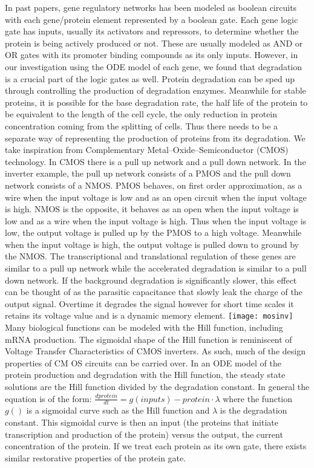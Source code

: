 \documentclass{article}
\begin{document}
In past papers, gene regulatory networks has been modeled as boolean circuits with each gene/protein element represented by a boolean gate.  Each gene logic gate has inputs, usually its activators and repressors, to determine whether the protein is being actively produced or not.  These are usually modeled as AND or OR gates with its promoter binding compounds as its only inputs.  However, in our investigation using the ODE model of each gene, we found that degradation is a crucial part of the logic gates as well.  Protein degradation can be sped up through controlling the production of degradation enzymes.  Meanwhile for stable proteins, it is possible for the base degradation rate, the half life of the protein to be equivalent to the length of the cell cycle, the only reduction in protein concentration coming from the splitting of cells.  Thus there needs to be a separate way of representing the production of proteins from its degradation.  We take inspiration from Complementary Metal–Oxide–Semiconductor (CMOS) technology.  In CMOS there is a pull up network and a pull down network.  In the inverter example, the pull up network consists of a PMOS and the pull down network consists of a NMOS.  PMOS behaves, on first order approximation, as a wire when the input voltage is low and as an open circuit when the input voltage is high.  NMOS is the opposite, it behaves as an open when the input voltage is low and as a wire when the input voltage is high.  Thus when the input voltage is low, the output voltage is pulled up by the PMOS to a high voltage.  Meanwhile when the input voltage is high, the output voltage is pulled down to ground by the NMOS.  The transcriptional and translational regulation of these genes are similar to a pull up network while the accelerated degradation is similar to a pull down network.  If the background degradation is significantly slower, this effect can be thought of as the parasitic capacitance that slowly leak the charge of the output signal.  Overtime it degrades the signal however for short time scales it retains its voltage value and is a dynamic memory element.
\newline
\texttt{[image: mosinv]}
\newline \newline
Many biological functions can be modeled with the Hill function, including mRNA production.  The sigmoidal shape of the Hill function is reminiscent of Voltage Transfer Characteristics of CMOS inverters.  As such, much of the design properties of CM
OS circuits can be carried over.    In an ODE model of the protein production and degradation with the Hill function, the steady state solutions are the Hill function divided by the degradation constant.  In general the equation is of the form: $\frac{dprotein}{dt}=g(inputs)-protein\cdot\lambda$  where the function $g()$ is a sigmoidal curve such as the Hill function and $\lambda$ is the degradation constant.  This sigmoidal curve is then an input (the proteins that initiate transcription and production of the protein) versus the output, the current concentration of the protein.  If we treat each protein as its own gate, there exists similar restorative properties of the protein gate.
\end{document}
